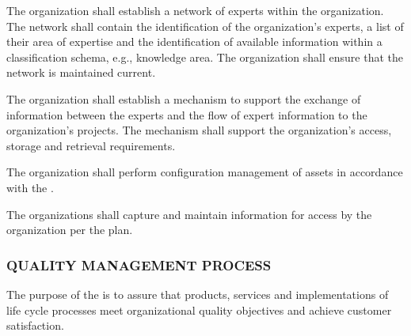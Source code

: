 \begin{adjustwidth}{2em}{0pt}
\begin{compactenum}
\begin{compactenum}
						\item The organization shall establish a network of experts within the organization. The network shall contain the identification of the organization's experts, a list of their area of expertise and the identification of available information within a classification schema, e.g., knowledge area. The organization shall ensure that the network is maintained current.

						\item The organization shall establish a mechanism to support the exchange of information between the experts and the flow of expert information to the organization's projects. The mechanism shall support the organization's access, storage and retrieval requirements.

						\item The organization shall perform configuration management of assets in accordance with the .

						\item The organizations shall capture and maintain information for access by the organization per the plan.

					\end{compactenum}

				\end{compactenum}

			\end{adjustwidth}

		\newpage
		\subsubsection{QUALITY MANAGEMENT PROCESS\label{proc:quality_management_process}}

			\begin{adjustwidth}{2em}{0pt} 
				
				The purpose of the  is to assure that products, services and implementations of life cycle processes meet organizational quality objectives and achieve customer satisfaction.

			\end{adjustwidth}

